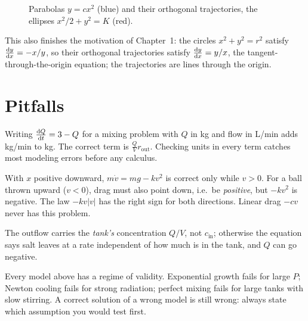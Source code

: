 \begin{figure}[ht]
  \centering
  
  \caption{Parabolas $y = cx^2$ (blue) and their orthogonal trajectories,
  the ellipses $x^2/2 + y^2 = K$ (red).}
  \label{fig:ch02-orthogonal}
\end{figure}

This also finishes the motivation of Chapter~1: the circles
$x^2 + y^2 = r^2$ satisfy $\frac{\mathrm{d}y}{\mathrm{d}x} = -x/y$, so their orthogonal
trajectories satisfy $\frac{\mathrm{d}y}{\mathrm{d}x} = y/x$, the tangent-through-the-origin
equation; the trajectories are lines through the origin.

\section{Pitfalls}\label{sec:ch02-pitfalls}

\begin{pitfall}\label{pit:ch02-units}
Writing $\frac{\mathrm{d}Q}{\mathrm{d}t} = 3 - Q$ for a mixing problem with $Q$ in kg and flow in
L/min adds kg/min to kg. The correct term is $\frac{Q}{V}r_{\mathrm{out}}$.
Checking units in every term catches most modeling errors before any calculus.
\end{pitfall}

\begin{pitfall}\label{pit:ch02-drag-sign}
With $x$ positive downward, $m\dot v = mg - kv^2$ is correct only while
$v>0$. For a ball thrown upward ($v<0$), drag must also point down, i.e.\ be
\emph{positive}, but $-kv^2$ is negative. The law $-kv|v|$ has the right sign
for both directions. Linear drag $-cv$ never has this problem.
\end{pitfall}

\begin{pitfall}\label{pit:ch02-mixing}
The outflow carries the \emph{tank's} concentration $Q/V$, not $c_{\mathrm{in}}$;
otherwise the equation says salt leaves at a rate independent of how much is
in the tank, and $Q$ can go negative.
\end{pitfall}

\begin{pitfall}\label{pit:ch02-model}
Every model above has a regime of validity. Exponential growth fails for large
$P$; Newton cooling fails for strong radiation; perfect mixing fails for large
tanks with slow stirring. A correct solution of a wrong model is still wrong:
always state which assumption you would test first.
\end{pitfall}

